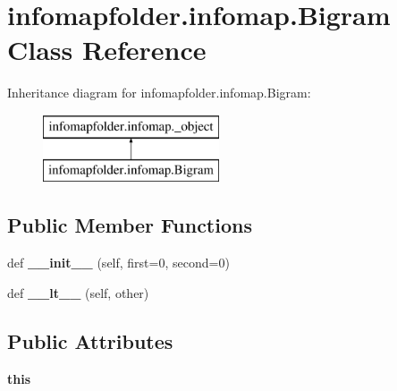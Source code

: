 \hypertarget{classinfomapfolder_1_1infomap_1_1Bigram}{}\section{infomapfolder.\+infomap.\+Bigram Class Reference}
\label{classinfomapfolder_1_1infomap_1_1Bigram}
Inheritance diagram for infomapfolder.\+infomap.\+Bigram\+:\begin{figure}[H]
\begin{center}
\leavevmode
\includegraphics[height=2.000000cm]{classinfomapfolder_1_1infomap_1_1Bigram}
\end{center}
\end{figure}
\subsection*{Public Member Functions}
\begin{DoxyCompactItemize}
\item 
\mbox{\label{classinfomapfolder_1_1infomap_1_1Bigram_afe65c220ea17567f409eda194c74f9b2}} 
def {\bfseries \+\_\+\+\_\+init\+\_\+\+\_\+} (self, first=0, second=0)
\item 
\mbox{\label{classinfomapfolder_1_1infomap_1_1Bigram_aed321ada46d88112a4de854be77d7d29}} 
def {\bfseries \+\_\+\+\_\+lt\+\_\+\+\_\+} (self, other)
\end{DoxyCompactItemize}
\subsection*{Public Attributes}
\begin{DoxyCompactItemize}
\item 
\mbox{\label{classinfomapfolder_1_1infomap_1_1Bigram_a87f34d28c98a3937cfd696d909566c60}} 
{\bfseries this}
\end{DoxyCompactItemize}
